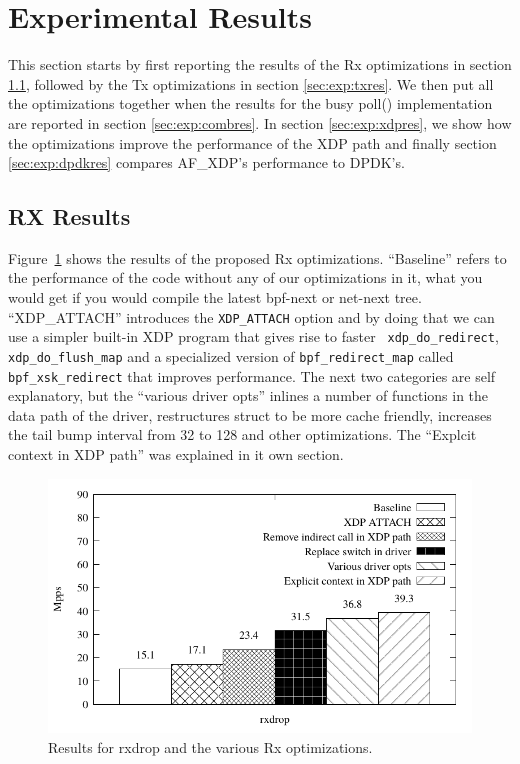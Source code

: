 \documentclass[9pt,numbers,reprint]{sigplanconf}
\begin{document}
\section{Experimental Results}
\label{sec:exp:res}

This section starts by first reporting the results of the Rx
optimizations in section \ref{sec:exp:rxres}, followed by the Tx
optimizations in section \ref{sec:exp:txres}. We then put all the
optimizations together when the results for the busy poll()
implementation are reported in section \ref{sec:exp:combres}. In
section \ref{sec:exp:xdpres}, we show how the optimizations improve
the performance of the XDP path and finally section
\ref{sec:exp:dpdkres} compares AF\_XDP's performance to DPDK's.


\subsection{RX Results}
\label{sec:exp:rxres}


Figure~\ref{fig:results_rx} shows the results of the proposed Rx
optimizations. ``Baseline'' refers to the performance of the code
without any of our optimizations in it, what you would get if you
would compile the latest bpf-next or net-next tree.  ``XDP\_ATTACH''
introduces the {\tt XDP\_ATTACH} option and by doing that we can use a
simpler built-in XDP program that gives rise to faster {\tt
  xdp\_do\_redirect}, {\tt xdp\_do\_flush\_map} and a specialized
version of {\tt bpf\_redirect\_map} called {\tt bpf\_xsk\_redirect}
that improves performance. The next two categories are self
explanatory, but the ``various driver opts'' inlines a number of
functions in the data path of the driver, restructures struct to be
more cache friendly, increases the tail bump interval from 32 to 128
and other optimizations. The ``Explcit context in XDP path'' was
explained in it own section.

\begin{figure}[ht]
\centering
\includegraphics[width=.5\textwidth]{results_rx.pdf}
\caption{Results for rxdrop and the various Rx optimizations.}
\label{fig:results_rx}
\end{figure}
\end{document}
